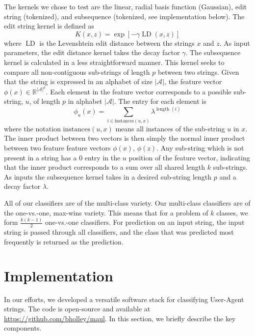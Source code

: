 \documentclass[10pt]{article}
\begin{document}
\begin{multicols}{2}
The kernels we chose to test are the linear, radial basis function (Gaussian), edit string (tokenized), and subsequence (tokenized, see implementation below).  The edit string kernel is defined as
\begin{equation}
K(x,z) = \exp \left[ - \gamma \operatorname{LD}(x,z) \right]
\end{equation}
where $\operatorname{LD}$ is the Levenshtein edit distance between the strings $x$ and $z$.  As input parameters, the edit distance kernel takes the decay factor $\gamma$.  The subsequence kernel is calculated in a less straightforward manner.  This kernel seeks to compare all non-contiguous sub-strings of length $p$ between two strings.\cite{subseqkernel}  Given that the string is expressed in an alphabet of size $|\mathcal{A}|$, the feature vector $\phi(x) \in \mathbb{R}^{|\mathcal{A}|^p}$.  Each element in the feature vector corresponds to a possible sub-string, $u$, of length $p$ in alphabet $|\mathcal{A}|$.  The entry for each element is 
\begin{equation}\phi_u(x) = \sum_{i \in \text{instances}(u,x)} \lambda^{\operatorname{length}(i)}
\end{equation}
where the notation $ \text{instances}(u,x)$ means all instances of the sub-string $u$ in $x$.  The inner product between two vectors is then simply  the normal inner product between two feature feature vectors $\phi(x)$, $\phi(z)$.  Any sub-string which is not present in a string has a $0$ entry in the $u$ position of the feature vector, indicating that the inner product corresponds to a sum over all shared length $k$ sub-strings.  As inputs the subsequence kernel takes in a desired sub-string length $p$ and a decay factor $\lambda$.

All of our classifiers are of the multi-class variety.  Our multi-class classifiers are of the one-vs.-one, max-wins variety.  This means that for a problem of $k$ classes, we form $\frac{k(k-1)}{2}$ one-vs.-one classifiers.  For prediction on an input string, the input string is passed through all classifiers, and the class that was predicted most frequently is returned as the prediction.  

\section{Implementation}

In our efforts, we developed a  versatile software stack for classifying User-Agent strings. The code is open-source and available at \url{https://github.com/bholley/maul}. In this section, we briefly describe the key components.



\end{multicols}
\end{document}
